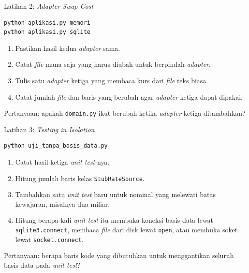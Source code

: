 \documentclass[aspectratio=169, table, 12pt]{beamer}
\begin{document}
\begin{frame}[fragile]{{\Large Latihan 2: \textit{Adapter Swap Cost}}}
  \vspace{3pt}
\begin{lstlisting}[language=bash]
python aplikasi.py memori
python aplikasi.py sqlite
\end{lstlisting}

  \vspace{3pt}
  \begin{enumerate}
    \item Pastikan hasil kedua \textit{adapter} sama.
    \item Catat \textit{file} mana saja yang harus diubah untuk berpindah
      \textit{adapter}.
    \item Tulis satu \textit{adapter} ketiga yang membaca kurs dari
      \textit{file} teks biasa.
    \item Catat jumlah \textit{file} dan baris yang berubah agar
      \textit{adapter} ketiga dapat dipakai.
  \end{enumerate}

  \vspace{3pt}
  {\small Pertanyaan: apakah \texttt{domain.py} ikut berubah ketika
  \textit{adapter} ketiga ditambahkan?}
\end{frame}

\begin{frame}[fragile]{{\Large Latihan 3: \textit{Testing in Isolation}}}
  \vspace{3pt}
\begin{lstlisting}[language=bash]
python uji_tanpa_basis_data.py
\end{lstlisting}

  \vspace{3pt}
  \begin{enumerate}
    \item Catat hasil ketiga \textit{unit test}-nya.
    \item Hitung jumlah baris kelas \texttt{StubRateSource}.
    \item Tambahkan satu \textit{unit test} baru untuk nominal yang melewati
      batas kewajaran, misalnya dua miliar.
    \item Hitung berapa kali \textit{unit test} itu membuka koneksi basis data
      lewat \texttt{sqlite3.connect}, membaca \textit{file} dari disk lewat
      \texttt{open}, atau membuka soket lewat \texttt{socket.connect}.
  \end{enumerate}

  \vspace{3pt}
  {\small Pertanyaan: berapa baris kode yang dibutuhkan untuk menggantikan
  seluruh basis data pada \textit{unit test}?}
\end{frame}
\end{document}
